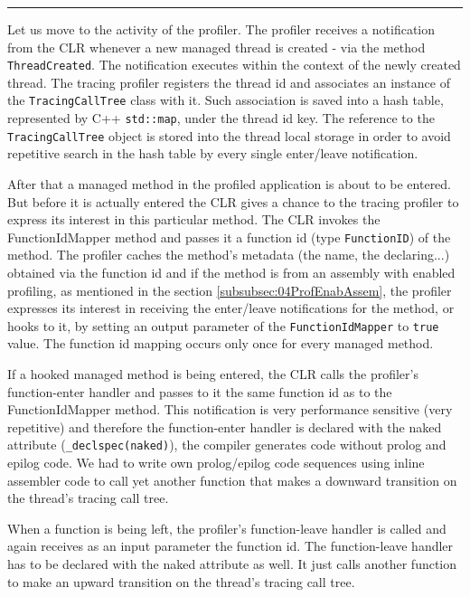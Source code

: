 \begin{center}
\rule{300pt}{1.5pt}
\end{center}
Let us move to the activity of the profiler. The profiler receives a notification from the CLR whenever a new managed thread is created - via the method \texttt{ThreadCreated}. The notification executes within the context of the newly created thread. The tracing profiler registers the thread id and associates an instance of the \texttt{TracingCallTree} class with it. Such association is saved into a hash table, represented by C++ \texttt{std::map}, under the thread id key. The reference to the \texttt{TracingCallTree} object is stored into the thread local storage in order to avoid repetitive search in the hash table by every single enter/leave notification.

After that a managed method in the profiled application is about to be entered. But before it is actually entered the CLR gives a chance to the tracing profiler to express its interest in this particular method. The CLR invokes the FunctionIdMapper method and passes it a function id (type \texttt{FunctionID}) of the method. The profiler caches the method's metadata (the name, the declaring...) obtained via the function id and if the method is from an assembly with enabled profiling, as mentioned in the section \ref{subsubsec:04ProfEnabAssem}, the profiler expresses its interest in receiving the enter/leave notifications for the method,  or hooks to it, by setting an output parameter of the \texttt{FunctionIdMapper} to \texttt{true} value. The function id mapping occurs only once for every managed method.

If a hooked managed method is being entered, the CLR calls the profiler's function-enter handler and passes to it the same function id as to the FunctionIdMapper method. This notification is very performance sensitive (very repetitive) and therefore the function-enter handler is declared with the naked attribute (\texttt{\_declspec(naked)}), the compiler generates code without prolog and epilog code. We had to write own prolog/epilog code sequences using inline assembler code to call yet another function that makes a downward transition on the thread's tracing call tree.

When a function is being left, the profiler's function-leave handler is called and again receives as an input parameter the function id. The function-leave handler has to be declared with the naked attribute as well. It just calls another function to make an upward transition on the thread's tracing call tree.

